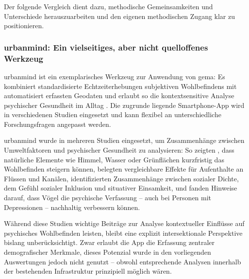Der folgende Vergleich dient dazu, methodische Gemeinsamkeiten und Unterschiede herauszuarbeiten und den eigenen methodischen Zugang klar zu positionieren.


\subsubsection*{\gls{urbanmind}: Ein vielseitiges, aber nicht quelloffenes Werkzeug}

\gls{urbanmind} ist ein exemplarisches Werkzeug zur Anwendung von \acrshort{gema}: Es kombiniert standardisierte Echtzeiterhebungen subjektiven Wohlbefindens mit automatisiert erfassten Geodaten und erlaubt so die kontextsensitive Analyse psychischer Gesundheit im Alltag \parencite{bakolisUrbanMindUsing2018}. Die zugrunde liegende Smartphone-App wird in verschiedenen Studien eingesetzt und kann flexibel an unterschiedliche Forschungsfragen angepasst werden.

\gls{urbanmind} wurde in mehreren Studien eingesetzt, um Zusammenhänge zwischen Umweltfaktoren und psychischer Gesundheit zu analysieren: So zeigten \textcite{bakolisUrbanMindUsing2018}, dass natürliche Elemente wie Himmel, Wasser oder Grünflächen kurzfristig das Wohlbefinden steigern können, \textcite{bergouMentalHealthBenefits2022} belegten vergleichbare Effekte für Aufenthalte an Flüssen und Kanälen, \textcite{hammoudLonelyCrowdInvestigating2021} identifizierten Zusammenhänge zwischen sozialer Dichte, dem Gefühl sozialer Inklusion und situativer Einsamkeit, und \textcite{hammoudSmartphonebasedEcologicalMomentary2022} fanden Hinweise darauf, dass Vögel die psychische Verfassung -- auch bei Personen mit Depressionen -- nachhaltig verbessern können.

Während diese Studien wichtige Beiträge zur Analyse kontextueller Einflüsse auf psychisches Wohlbefinden leisten, bleibt eine explizit intersektionale Perspektive bislang unberücksichtigt. Zwar erlaubt die App die Erfassung zentraler demografischer Merkmale, dieses Potenzial wurde in den vorliegenden Auswertungen jedoch nicht genutzt -- obwohl entsprechende Analysen innerhalb der bestehenden Infrastruktur prinzipiell möglich wären.


